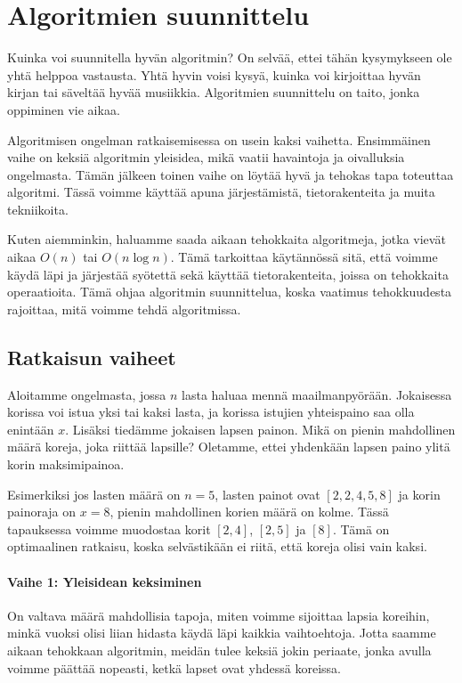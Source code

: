 \chapter{Algoritmien suunnittelu}

Kuinka voi suunnitella hyvän algoritmin?
On selvää, ettei tähän kysymykseen ole yhtä helppoa vastausta.
Yhtä hyvin voisi kysyä, kuinka voi kirjoittaa hyvän kirjan
tai säveltää hyvää musiikkia.
Algoritmien suunnittelu on taito, jonka oppiminen vie aikaa.

Algoritmisen ongelman ratkaisemisessa on usein kaksi vaihetta.
Ensim\-mäinen vaihe on keksiä algoritmin yleisidea,
mikä vaatii havaintoja ja oivalluksia ongelmasta.
Tämän jälkeen toinen vaihe on löytää hyvä ja tehokas tapa
toteuttaa algoritmi.
Tässä voimme käyttää apuna järjestämistä, tietorakenteita
ja muita tekniikoita.

Kuten aiemminkin, haluamme saada aikaan tehokkaita algoritmeja,
jotka vievät aikaa $O(n)$ tai $O(n \log n)$.
Tämä tarkoittaa käytännössä sitä, että voimme käydä läpi ja
järjestää syötettä sekä käyttää tietorakenteita,
joissa on tehokkaita operaatioita.
Tämä ohjaa algoritmin suunnittelua,
koska vaatimus tehokkuudesta rajoittaa,
mitä voimme tehdä algoritmissa.

\section{Ratkaisun vaiheet}

Aloitamme ongelmasta,
jossa $n$ lasta haluaa mennä maailmanpyörään.
Jokaisessa korissa voi istua yksi tai kaksi lasta,
ja korissa istujien yhteispaino saa olla enintään $x$.
Lisäksi tiedämme jokaisen lapsen painon.
Mikä on pienin mahdollinen määrä koreja,
joka riittää lapsille?
Oletamme, ettei yhdenkään lapsen paino ylitä
korin maksimipainoa.

Esimerkiksi jos lasten määrä on $n=5$,
lasten painot ovat $[2,2,4,5,8]$ ja korin painoraja on $x=8$,
pienin mahdollinen korien määrä on kolme.
Tässä tapauksessa voimme muodostaa korit
$[2,4]$, $[2,5]$ ja $[8]$.
Tämä on optimaalinen ratkaisu, koska selvästikään
ei riitä, että koreja olisi vain kaksi.

\subsubsection{Vaihe 1: Yleisidean keksiminen}

On valtava määrä mahdollisia tapoja,
miten voimme sijoittaa lapsia koreihin,
minkä vuoksi olisi liian hidasta käydä läpi
kaikkia vaihtoehtoja.
Jotta saamme aikaan tehokkaan algoritmin,
meidän tulee keksiä jokin periaate,
jonka avulla voimme päättää nopeasti,
ketkä lapset ovat yhdessä koreissa.

